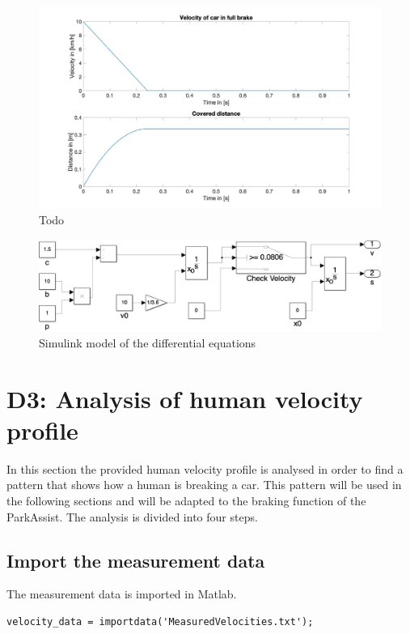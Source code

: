 \begin{figure}[H]
\centering
\includegraphics[width=1\textwidth]{images/D2_plot.jpg}
\caption{Todo}
\label{fig:ConceptArchitectureOverview}
\end{figure}

\begin{figure}[H]
\centering
\includegraphics[width=1\textwidth]{images/D2_sim.png}
\caption{Simulink model of the differential equations}
\label{fig:ConceptArchitectureOverview}
\end{figure}

\chapter{D3: Analysis of human velocity profile}\label{cha:D3}

In this section the provided human velocity profile is analysed in order to find a pattern that shows how a human is breaking a car. This pattern will be used in the following sections and will be adapted to the braking function of the ParkAssist. The analysis is divided into four steps.

\section{Import the measurement data}
The measurement data is imported in Matlab.

\begin{lstlisting}[basicstyle=\scriptsize	,caption= Import measurement data in Matlab,label= lst:D3Import]
%import velocity data
velocity_data = importdata('MeasuredVelocities.txt');
\end{lstlisting}

